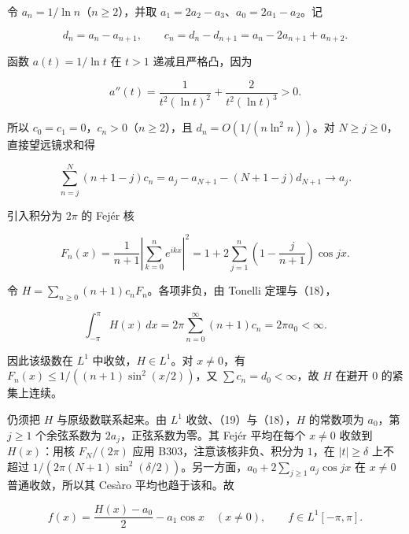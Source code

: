 \documentclass[11pt,a4paper]{article}
\begin{document}
令 \(a_n=1/\ln n\)（\(n\ge2\)），并取
\(a_1=2a_2-a_3\)、\(a_0=2a_1-a_2\)。记

\begin{equation}
d_n=a_n-a_{n+1},\qquad c_n=d_n-d_{n+1}=a_n-2a_{n+1}+a_{n+2}.
\tag{16}
\end{equation}

函数 \(a(t)=1/\ln t\) 在 \(t>1\) 递减且严格凸，因为

\begin{equation}
a''(t)=\frac1{t^2(\ln t)^2}+\frac2{t^2(\ln t)^3}>0.
\tag{17}
\end{equation}

所以 \(c_0=c_1=0\)，\(c_n>0\)（\(n\ge2\)），且
\(d_n=O(1/(n\ln^2n))\)。对 \(N\ge j\ge0\)，直接望远镜求和得

\begin{equation}
\sum_{n=j}^{N}(n+1-j)c_n
=a_j-a_{N+1}-(N+1-j)d_{N+1}\longrightarrow a_j.
\tag{18}
\end{equation}

引入积分为 \(2\pi\) 的 Fejér 核

\begin{equation}
F_n(x)=\frac1{n+1}\left|\sum_{k=0}^ne^{ikx}\right|^2
=1+2\sum_{j=1}^n\left(1-\frac j{n+1}\right)\cos jx.
\tag{19}
\end{equation}

令 \(H=\sum_{n\ge0}(n+1)c_nF_n\)。各项非负，由 Tonelli 定理与（18），

\begin{equation}
\int_{-\pi}^{\pi}H(x)\,dx
=2\pi\sum_{n=0}^{\infty}(n+1)c_n=2\pi a_0<\infty.
\tag{20}
\end{equation}

因此该级数在 \(L^1\) 中收敛，\(H\in L^1\)。对 \(x\ne0\)，有
\(F_n(x)\le1/((n+1)\sin^2(x/2))\)，又 \(\sum c_n=d_0<\infty\)，故 \(H\)
在避开 \(0\) 的紧集上连续。

仍须把 \(H\) 与原级数联系起来。由 \(L^1\) 收敛、（19）与（18），\(H\)
的常数项为 \(a_0\)，第 \(j\ge1\) 个余弦系数为 \(2a_j\)，正弦系数为零。其
Fejér 平均在每个 \(x\ne0\) 收敛到 \(H(x)\)：用核 \(F_N/(2\pi)\) 应用
B303，注意该核非负、积分为 \(1\)，在 \(|t|\ge\delta\) 上不超过
\(1/(2\pi(N+1)\sin^2(\delta/2))\)。另一方面，\(a_0+2\sum_{j\ge1}a_j\cos jx\)
在 \(x\ne0\) 普通收敛，所以其 Cesàro 平均也趋于该和。故

\begin{equation}
f(x)=\frac{H(x)-a_0}{2}-a_1\cos x\quad(x\ne0),
\qquad f\in L^1[-\pi,\pi].
\tag{21}
\end{equation}
\end{document}

